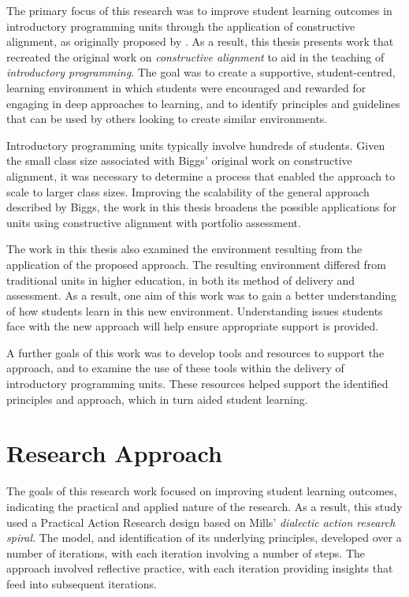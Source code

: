 The primary focus of this research was to improve student learning outcomes in introductory programming units through the application of constructive alignment, as originally proposed by \citet{Biggs:1996c}. As a result, this thesis presents work that recreated the original work on \emph{constructive alignment} to aid in the teaching of \emph{introductory programming}. The goal was to create a supportive, student-centred, learning environment in which students were encouraged and rewarded for engaging in deep approaches to learning, and to identify principles and guidelines that can be used by others looking to create similar environments.

Introductory programming units typically involve hundreds of students. Given the small class size associated with Biggs' original work on constructive alignment, it was necessary to determine a process that enabled the approach to scale to larger class sizes. Improving the scalability of the general approach described by Biggs, the work in this thesis broadens the possible applications for units using constructive alignment with portfolio assessment.

The work in this thesis also examined the environment resulting from the application of the proposed approach. The resulting environment differed from traditional units in higher education, in both its method of delivery and assessment. As a result, one aim of this work was to gain a better understanding of how students learn in this new environment. Understanding issues students face with the new approach will help ensure appropriate support is provided.

A further goals of this work was to develop tools and resources to support the approach, and to examine the use of these tools within the delivery of introductory programming units. These resources helped support the identified principles and approach, which in turn aided student learning.



\section{Research Approach} %
\label{sec:research_approach}

The goals of this research work focused on improving student learning outcomes, indicating the practical and applied nature of the research. As a result, this study used a Practical Action Research \cite{Creswell:2008} design based on Mills' \cite{Mills:2010} \emph{dialectic action research spiral}. The model, and identification of its underlying principles, developed over a number of iterations, with each iteration involving a number of steps. The approach involved reflective practice, with each iteration providing insights that feed into subsequent iterations.

